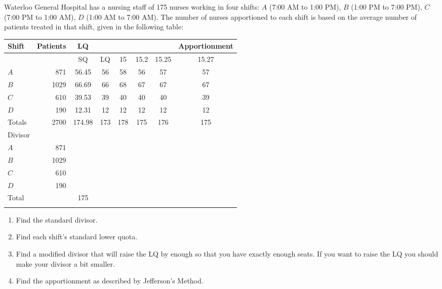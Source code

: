 \clearpage

\clearpage
\HOMEWORK
\begin{Denumerate}

	\item Waterloo General Hospital has a nursing staff of 175 nurses working in four shifts: $A$ (7:00 AM to 1:00 PM), $B$ (1:00 PM to 7:00 PM), $C$ (7:00 PM to 1:00 AM), $D$ (1:00 AM to 7:00 AM).  The number of nurses apportioned to each shift is based on the average number of patients treated in that shift, given in the following table:

	\begin{center}
	\large
		\begin{tabular}{lr|c|c|c|c|c|c}
	\hline
Shift		&	Patients &	LQ& \hspace{.75cm} 	& \hspace{.75cm}	& \hspace{.75cm} 	&\hspace{.75cm} 	&  	 	Apportionment \\\hline \ifsolns
  &  & SQ & LQ & 15 & 15.2  & 15.25 & 15.27\\\hline
 $A$  & 871 & 56.45 & 56 & 58 &  56 & 57 & 57\\\hline
 $B$  & 1029 & 66.69 & 66 & 68 &  67 & 67 & 67\\\hline
 $C$  & 610 & 39.53 & 39 & 40 & 40  & 40 & 39\\\hline
 $D$  & 190 & 12.31 & 12 & 12 & 12  & 12 & 12\\\hline\hline
Totals  & 2700 & 174.98 & 173 & 178 & 175 & 176 & 175\\\hline
\else
Divisor	&&&&&&&\\\hline

	 $A$ &	871 &&&&&&\\\hline
	 $B$ &	1029&&&&&&\\\hline
	 $C$&	610&&&&&&\\\hline
	$D$ &	190&&&&&&\\\hline
	Total & & 175 &&&&&\\\hline\fi
	\end{tabular}
	\normalsize
	\end{center}	
	
	\begin{enumerate}
		\item Find the standard divisor.
		\item Find each shift's standard lower quota.
		\item Find a modified divisor that will raise the LQ by enough so that you have exactly enough seats.  If you want to raise the LQ you should make your divisor a bit smaller.
		\item Find the apportionment as described by Jefferson's Method.
	\end{enumerate} \vfill


\end{Denumerate}
